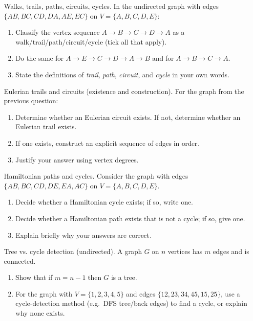 \documentclass[11pt]{article}
\def\textbf#1{#1}%
\newcounter{question}
\begin{document}
\begin{question}
\textbf{Walks, trails, paths, circuits, cycles.}
In the undirected graph with edges \\ $\{AB,BC,CD,DA,AE,EC\}$ on $V=\{A,B,C,D,E\}$:
\begin{enumerate}
  \item Classify the vertex sequence $A\!\to\!B\!\to\!C\!\to\!D\!\to\!A$ as a walk/trail/path/circuit/cycle (tick all that apply).
  \item Do the same for $A\!\to\!E\!\to\!C\!\to\!D\!\to\!A\!\to\!B$ and for $A\!\to\!B\!\to\!C\!\to\!A$.
  \item State the definitions of \emph{trail}, \emph{path}, \emph{circuit}, and \emph{cycle} in your own words.
\end{enumerate}
\end{question}

\begin{question}
\textbf{Eulerian trails and circuits (existence and construction).}
For the graph from the previous question:
\begin{enumerate}
  \item Determine whether an Eulerian circuit exists. If not, determine whether an Eulerian trail exists.
  \item If one exists, construct an explicit sequence of edges in order.
  \item Justify your answer using vertex degrees.
\end{enumerate}
\end{question}

\begin{question}
\textbf{Hamiltonian paths and cycles.}
Consider the graph with edges $\{AB,BC,CD,DE,EA,AC\}$ on $V=\{A,B,C,D,E\}$.
\begin{enumerate}
  \item Decide whether a Hamiltonian cycle exists; if so, write one.
  \item Decide whether a Hamiltonian path exists that is not a cycle; if so, give one.
  \item Explain briefly why your answers are correct.
\end{enumerate}
\end{question}

\begin{question}
\textbf{Tree vs. cycle detection (undirected).}
A graph $G$ on $n$ vertices has $m$ edges and is connected.
\begin{enumerate}
  \item Show that if $m=n-1$ then $G$ is a tree. 
  \item For the graph with $V=\{1,2,3,4,5\}$ and edges $\{12,23,34,45,15,25\}$, use a cycle-detection method (e.g.\ DFS tree/back edges) to find a cycle, or explain why none exists.
\end{enumerate}
\end{question}
\end{document}
